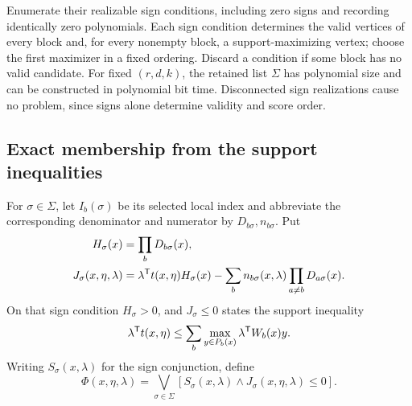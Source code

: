 Enumerate their realizable sign conditions, including zero signs and
recording identically zero polynomials. Each sign condition determines the
valid vertices of every block and, for every nonempty block, a
support-maximizing vertex; choose the first maximizer in a fixed ordering.
Discard a condition if some block has no valid candidate. For fixed
$(r,d,k)$, the retained list $\Sigma$ has polynomial size and can be
constructed in polynomial bit time. Disconnected sign realizations cause no
problem, since signs alone determine validity and score order.

\subsection{Exact membership from the support inequalities}\label{app:support-membership}

For $\sigma\in\Sigma$, let $I_b(\sigma)$ be its selected local
index and abbreviate the corresponding denominator and numerator by
$D_{b\sigma},n_{b\sigma}$. Put
\begin{equation}\label{eq:core-cleared-support}
 \begin{split}
 H_\sigma(x)&=\prod_bD_{b\sigma}(x),\\
 J_\sigma(x,\eta,\lambda)&=
 \lambda^{\mathsf T} t(x,\eta)H_\sigma(x)
             -\sum_b n_{b\sigma}(x,\lambda)\prod_{a\ne b}D_{a\sigma}(x).
 \end{split}
\end{equation}
On that sign condition $H_\sigma>0$, and $J_\sigma\le0$ states the
support inequality
\[
 \lambda^{\mathsf T} t(x,\eta)\le
                     \sum_b\max_{y\in P_b(x)}\lambda^{\mathsf T} W_b(x)y.
\]
Writing $S_\sigma(x,\lambda)$ for the sign conjunction, define
\begin{equation}\label{eq:core-support-predicate}
 \Phi(x,\eta,\lambda)=\bigvee_{\sigma\in\Sigma}
                  [S_\sigma(x,\lambda)\wedge J_\sigma(x,\eta,\lambda)\le0].
\end{equation}

